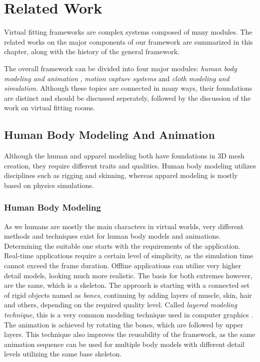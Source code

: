 \chapter{Related Work}
\label{chapter_related_work}

Virtual fitting frameworks are complex systems composed of many modules. The related works on the major components of our framework are summarized in this chapter, 
along with the history of the general framework. 

The overall framework can be divided into four major modules: \textit{human body modeling and animation} , \textit{motion capture systems} and 
\textit{cloth modeling and simulation}. Although these topics are connected in many ways, their foundations are distinct 
and should be discussed seperately, followed by the discussion of the work on virtual fitting rooms.

\section{Human Body Modeling And Animation}
\label{section_related_modeling}

Although the human and apparel modeling both have foundations in 3D mesh creation, they require different traits and qualities. Human body modeling utilizes disciplines such as rigging and 
skinning, whereas apparel modeling is mostly based on physics simulations.

\subsection{Human Body Modeling}
As we humans are mostly the main characters in virtual worlds, very different methods and techniques exist for human body models and animations. Determining the suitable one 
starts with the requirements of the application. Real-time applications require a certain level of simplicity, as the simulation time cannot exceed the frame duration. Offline 
applications can utilize very higher detail models, looking much more realistic. The basis for both extremes however, are the same, which is a skeleton. The approach is starting 
with a connected set of rigid objects named as \textit{bones}, continuing by adding layers of muscle, skin, hair and others, depending on the required quality level. Called \textit{layered
modeling technique}, this is a very common modeling technique used in computer graphics \cite{Chadwick1989}. The animation is achieved by rotating the bones, which are followed by 
upper layers. This technique also improves the reusability of the framework, as the same animation sequence can be used for multiple body models with different detail levels utilizing the 
same base skeleton.   

